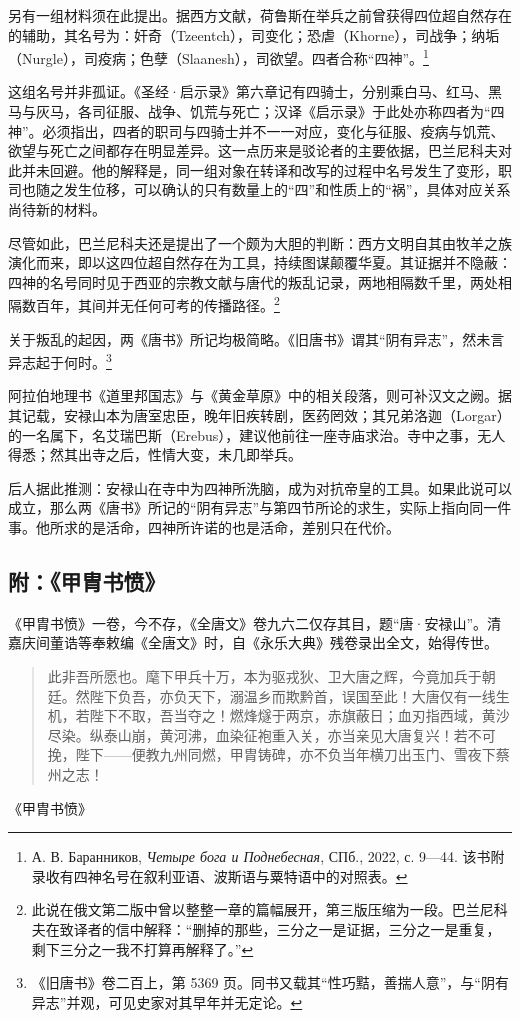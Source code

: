 另有一组材料须在此提出。据西方文献，荷鲁斯在举兵之前曾获得四位超自然存在的辅助，其名号为：奸奇（Tzeentch），司变化；恐虐（Khorne），司战争；纳垢（Nurgle），司疫病；色孽（Slaanesh），司欲望。四者合称“四神”。\footnote{А. В. Баранников, \textit{Четыре бога и Поднебесная}, СПб., 2022, с. 9—44. 该书附录收有四神名号在叙利亚语、波斯语与粟特语中的对照表。}

这组名号并非孤证。《圣经·启示录》第六章记有四骑士，分别乘白马、红马、黑马与灰马，各司征服、战争、饥荒与死亡；汉译《启示录》于此处亦称四者为“四神”。必须指出，四者的职司与四骑士并不一一对应，变化与征服、疫病与饥荒、欲望与死亡之间都存在明显差异。这一点历来是驳论者的主要依据，巴兰尼科夫对此并未回避。他的解释是，同一组对象在转译和改写的过程中名号发生了变形，职司也随之发生位移，可以确认的只有数量上的“四”和性质上的“祸”，具体对应关系尚待新的材料。

尽管如此，巴兰尼科夫还是提出了一个颇为大胆的判断：西方文明自其由牧羊之族演化而来，即以这四位超自然存在为工具，持续图谋颠覆华夏。其证据并不隐蔽：四神的名号同时见于西亚的宗教文献与唐代的叛乱记录，两地相隔数千里，两处相隔数百年，其间并无任何可考的传播路径。\footnote{此说在俄文第二版中曾以整整一章的篇幅展开，第三版压缩为一段。巴兰尼科夫在致译者的信中解释：“删掉的那些，三分之一是证据，三分之一是重复，剩下三分之一我不打算再解释了。”}

关于叛乱的起因，两《唐书》所记均极简略。《旧唐书》谓其“阴有异志”，然未言异志起于何时。\footnote{《旧唐书》卷二百上，第 5369 页。同书又载其“性巧黠，善揣人意”，与“阴有异志”并观，可见史家对其早年并无定论。}

阿拉伯地理书《道里邦国志》与《黄金草原》中的相关段落，则可补汉文之阙。据其记载，安禄山本为唐室忠臣，晚年旧疾转剧，医药罔效；其兄弟洛迦（Lorgar）的一名属下，名艾瑞巴斯（Erebus），建议他前往一座寺庙求治。寺中之事，无人得悉；然其出寺之后，性情大变，未几即举兵。

后人据此推测：安禄山在寺中为四神所洗脑，成为对抗帝皇的工具。如果此说可以成立，那么两《唐书》所记的“阴有异志”与第四节所论的求生，实际上指向同一件事。他所求的是活命，四神所许诺的也是活命，差别只在代价。

\subsection*{附：《甲胄书愤》}

《甲胄书愤》一卷，今不存，《全唐文》卷九六二仅存其目，题“唐·安禄山”。清嘉庆间董诰等奉敕编《全唐文》时，自《永乐大典》残卷录出全文，始得传世。

\vspace{2mm}
\begin{quote}
\small
此非吾所愿也。麾下甲兵十万，本为驱戎狄、卫大唐之辉，今竟加兵于朝廷。然陛下负吾，亦负天下，溺温乡而欺黔首，误国至此！大唐仅有一线生机，若陛下不取，吾当夺之！燃烽燧于两京，赤旗蔽日；血刃指西域，黄沙尽染。纵泰山崩，黄河沸，血染征袍重入关，亦当亲见大唐复兴！若不可挽，陛下——便教九州同燃，甲胄铸碑，亦不负当年横刀出玉门、雪夜下蔡州之志！
\end{quote}
\vspace{-4mm}
\begin{flushright}
{\small 《甲胄书愤》}
\end{flushright}
\vspace{2mm}

